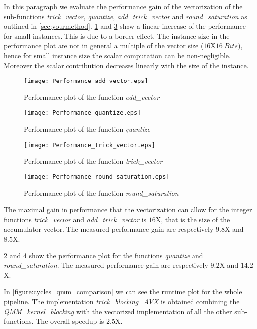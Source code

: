 In this paragraph we evaluate the performance gain of the vectorization of the sub-functions \emph{trick\_vector}, \emph{quantize}, \emph{add\_trick\_vector} and \emph{round\_saturation} as outlined in \cref{sec:yourmethod}. \cref{figure:performance_add_vector} and \cref{figure:performance_trick_vector} show a linear increase of the performance for small instances. This is due to a border effect. The instance size in the  performance plot are not in general a multiple of the vector size ($16$X$16 \ Bits$), hence for small instance size the scalar computation can be non-negligible. Moreover the scalar contribution decreases linearly with the size of the instance.

\begin{figure}[h]
\texttt{[image: Performance\_add\_vector.eps]}
\caption{Performance plot of the function \emph{add\_vector}}
\label{figure:performance_add_vector}
\end{figure}

\begin{figure}
	\texttt{[image: Performance\_quantize.eps]}
	\caption{Performance plot of the function \emph{quantize}}
	\label{figure:performance_quantize}
\end{figure}

\begin{figure}
\texttt{[image: Performance\_trick\_vector.eps]}
\caption{Performance plot of the function \emph{trick\_vector}}
\label{figure:performance_trick_vector}
\end{figure}

\begin{figure}
\texttt{[image: Performance\_round\_saturation.eps]}
\caption{Performance plot of the function \emph{round\_saturation}}
\label{figure:performance_round_saturation}
\end{figure}

The maximal gain in performance that the vectorization can allow for the integer functions \emph{trick\_vector} and \emph{add\_trick\_vector} is $16$X, that is the size of the accumulator vector. The measured performance gain are respectively  $9.8$X and $8.5$X.

\cref{figure:performance_quantize} and \cref{figure:performance_round_saturation} show the performance plot for the functions \emph{quantize} and \emph{round\_saturation}. The measured performance gain are respectively $9.2$X and $14.2$X. 

In \cref{figure:cycles_qmm_comparison} we can see the runtime plot for the whole pipeline. The implementation \emph{trick\_blocking\_AVX} is obtained combining the \emph{QMM\_kernel\_blocking} with the vectorized implementation of all the other sub-functions. The overall speedup is $2.5$X.